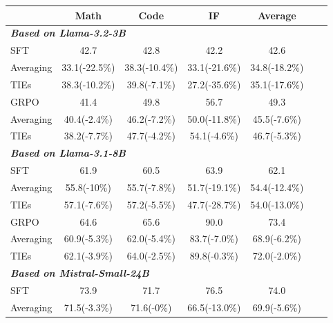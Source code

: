 \documentclass{article} %
\begin{document}
\begin{table}[]
\centering
\footnotesize
\renewcommand{\arraystretch}{1.1} 
\begin{tabular}{lcccccc}
\hline
                & \textbf{Math}         & \textbf{Code}         & \textbf{IF}             & \textbf{Average}  \\ \hline
\multicolumn{5}{l}{\textbf{\textit{Based on Llama-3.2-3B}}}\\
SFT             & 42.7                  & 42.8                  & 42.2                    & 42.6 \\
Averaging       & 33.1(-22.5\%)           & 38.3(-10.4\%)          & 33.1(-21.6\%)        & 34.8(-18.2\%) \\
TIEs            & 38.3(-10.2\%)          & 39.8(-7.1\%)          & 27.2(-35.6\%)          & 35.1(-17.6\%) \\
\hdashline
GRPO            & 41.4                  & 49.8                  & 56.7                    & 49.3 \\
Averaging       & 40.4(-2.4\%)          & 46.2(-7.2\%)          & 50.0(-11.8\%)           & 45.5(-7.6\%) \\
TIEs            & 38.2(-7.7\%)          & 47.7(-4.2\%)          & 54.1(-4.6\%)            & 46.7(-5.3\%) \\ 
\hline
\multicolumn{5}{l}{\textbf{\textit{Based on Llama-3.1-8B}}}\\
SFT             & 61.9                  & 60.5                  & 63.9                    & 62.1 \\
Averaging       & 55.8(-10\%)           & 55.7(-7.8\%)          & 51.7(-19.1\%)           & 54.4(-12.4\%) \\
TIEs            & 57.1(-7.6\%)          & 57.2(-5.5\%)          & 47.7(-28.7\%)           & 54.0(-13.0\%) \\
\hdashline
GRPO            & 64.6                  & 65.6                  & 90.0                    & 73.4 \\
Averaging       & 60.9(-5.3\%)          & 62.0(-5.4\%)          & 83.7(-7.0\%)            & 68.9(-6.2\%) \\
TIEs            & 62.1(-3.9\%)          & 64.0(-2.5\%)          & 89.8(-0.3\%)            & 72.0(-2.0\%) \\ 
\hline
\multicolumn{5}{l}{\textbf{\textit{Based on Mistral-Small-24B}}}\\
SFT             & 73.9                  & 71.7                  & 76.5                    & 74.0 \\
Averaging       & 71.5(-3.3\%)          & 71.6(-0\%)            & 66.5(-13.0\%)           & 69.9(-5.6\%) \\

\end{tabular}
\end{table}
\end{document}
